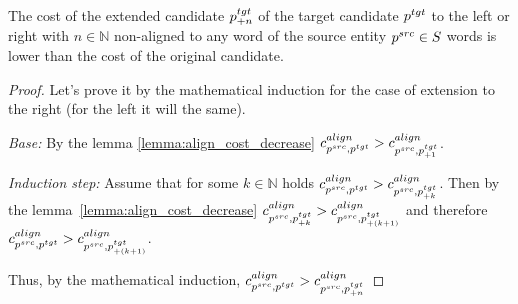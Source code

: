 \begin{corollary} \label{col:shrink_cand}
  The cost of the extended candidate \( p_{+n}^{tgt} \) of the target candidate \( p^{tgt} \) to the left or right with
  \( n \in \mathbb{N} \) non-aligned to any word of the source entity \( p^{src} \in S \) words is lower than
  the cost of the original candidate.
\end{corollary}
\begin{proof} Let's prove it by the mathematical induction for the case of extension to the right (for the left it will the same).

  \textit{Base:} By the lemma \ref{lemma:align_cost_decrease} \( c_{p^{src}, p^{tgt}}^{align} > c_{p^{src}, p_{+1}^{tgt}}^{align} \).

  \textit{Induction step:} Assume that for some \( k \in \mathbb{N} \) holds \( c_{p^{src}, p^{tgt}}^{align} > c_{p^{src}, p_{+k}^{tgt}}^{align} \).
  Then by the lemma~\ref{lemma:align_cost_decrease} \( c_{p^{src}, p_{+k}^{tgt}}^{align} > c_{p^{src}, p_{+(k+1)}^{tgt}}^{align} \) and therefore
  \( c_{p^{src}, p^{tgt}}^{align} > c_{p^{src}, p_{+(k+1)}^{tgt}}^{align} \).

  Thus, by the mathematical induction, \( c_{p^{src}, p^{tgt}}^{align} > c_{p^{src}, p_{+n}^{tgt}}^{align}   \)

\end{proof}


